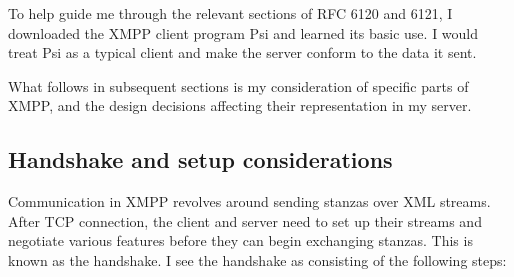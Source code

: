 To help guide me through the relevant sections of RFC 6120 and 6121, I downloaded the XMPP client program Psi\cite{Psi-IM} and learned its basic use. I would treat Psi as a typical client and make the server conform to the data it sent.

What follows in subsequent sections is my consideration of specific parts of XMPP, and the design decisions affecting their representation in my server.

\subsection{Handshake and setup considerations}
Communication in XMPP revolves around sending stanzas over XML streams. After TCP connection, the client and server need to set up their streams and negotiate various features before they can begin exchanging stanzas. This is known as the handshake. I see the handshake as consisting of the following steps:
